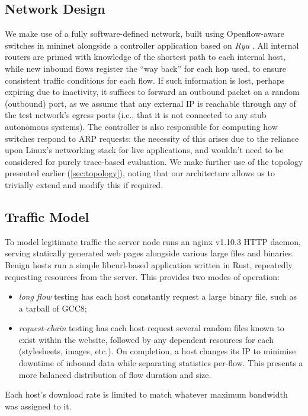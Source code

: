 \documentclass[conference, letterpaper, 10pt, times]{IEEEtran}
\begin{document}
\subsection{Network Design}
We make use of a fully software-defined network, built using Openflow-aware switches in mininet alongside a controller application based on \emph{Ryu} \cite{ryu}.
All internal routers are primed with knowledge of the shortest path to each internal host, while new inbound flows register the ``way back'' for each hop used, to ensure consistent traffic conditions for each flow.
If such information is lost, perhaps expiring due to inactivity, it suffices to forward an outbound packet on a random (outbound) port, as we assume that any external IP is reachable through any of the test network's egress ports (i.e., that it is not connected to any stub autonomous systems).
The controller is also responsible for computing how switches respond to ARP requests: the necessity of this arises due to the reliance upon Linux's networking stack for live applications, and wouldn't need to be considered for purely trace-based evaluation.
We make further use of the topology presented earlier (\cref{sec:topology}), noting that our architecture allows us to trivially extend and modify this if required.

\subsection{Traffic Model}
To model legitimate traffic the server node runs an nginx v1.10.3 HTTP daemon, serving statically generated web pages alongside various large files and binaries.
Benign hosts run a simple libcurl-based application written in Rust, repeatedly requesting resources from the server.
This provides two modes of operation:
\begin{itemize}
	\item \emph{long flow} testing has each host constantly request a large binary file, such as a tarball of GCC8;
	\item \emph{request-chain} testing has each host request several random files known to exist within the website, followed by any dependent resources for each (stylesheets, images, etc.). On completion, a host changes its IP to minimise downtime of inbound data while separating statistics per-flow. This presents a more balanced distribution of flow duration and size.
\end{itemize}
Each host's download rate is limited to match whatever maximum bandwidth was assigned to it.
\end{document}

